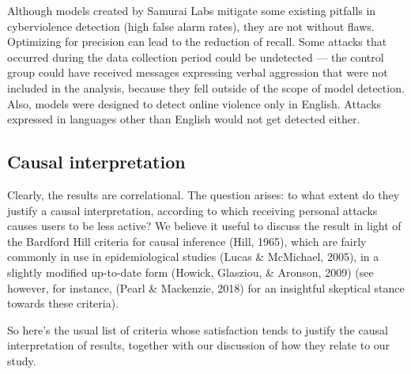 \documentclass[
  10pt,
  dvipsnames]{scrartcl}
\begin{document}
Although models created by Samurai Labs mitigate some existing pitfalls
in cyberviolence detection (high false alarm rates), they are not
without flaws. Optimizing for precision can lead to the reduction of
recall. Some attacks that occurred during the data collection period
could be undetected --- the control group could have received messages
expressing verbal aggression that were not included in the analysis,
because they fell outside of the scope of model detection. Also, models
were designed to detect online violence only in English. Attacks
expressed in languages other than English would not get detected either.

\subsection{Causal interpretation}

Clearly, the results are correlational. The question arises: to what
extent do they justify a causal interpretation, according to which
receiving personal attacks causes users to be less active? We believe it
useful to discuss the result in light of the Bardford Hill criteria for
causal inference (Hill, 1965), which are fairly commonly in use in
epidemiological studies (Lucas \& McMichael, 2005), in a slightly
modified up-to-date form (Howick, Glasziou, \& Aronson, 2009) (see
however, for instance, (Pearl \& Mackenzie, 2018) for an insightful
skeptical stance towards these criteria).

So here's the usual list of criteria whose satisfaction tends to justify
the causal interpretation of results, together with our discussion of
how they relate to our study.

\vspace{2mm}
\end{document}
